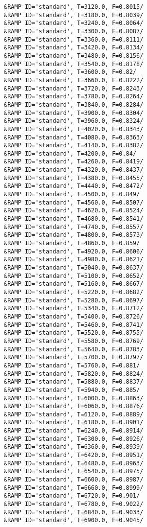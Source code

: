 \begin{lstlisting}
&RAMP ID='standard', T=3120.0, F=0.8015/
&RAMP ID='standard', T=3180.0, F=0.8039/
&RAMP ID='standard', T=3240.0, F=0.8064/
&RAMP ID='standard', T=3300.0, F=0.8087/
&RAMP ID='standard', T=3360.0, F=0.8111/
&RAMP ID='standard', T=3420.0, F=0.8134/
&RAMP ID='standard', T=3480.0, F=0.8156/
&RAMP ID='standard', T=3540.0, F=0.8178/
&RAMP ID='standard', T=3600.0, F=0.82/
&RAMP ID='standard', T=3660.0, F=0.8222/
&RAMP ID='standard', T=3720.0, F=0.8243/
&RAMP ID='standard', T=3780.0, F=0.8264/
&RAMP ID='standard', T=3840.0, F=0.8284/
&RAMP ID='standard', T=3900.0, F=0.8304/
&RAMP ID='standard', T=3960.0, F=0.8324/
&RAMP ID='standard', T=4020.0, F=0.8343/
&RAMP ID='standard', T=4080.0, F=0.8363/
&RAMP ID='standard', T=4140.0, F=0.8382/
&RAMP ID='standard', T=4200.0, F=0.84/
&RAMP ID='standard', T=4260.0, F=0.8419/
&RAMP ID='standard', T=4320.0, F=0.8437/
&RAMP ID='standard', T=4380.0, F=0.8455/
&RAMP ID='standard', T=4440.0, F=0.8472/
&RAMP ID='standard', T=4500.0, F=0.849/
&RAMP ID='standard', T=4560.0, F=0.8507/
&RAMP ID='standard', T=4620.0, F=0.8524/
&RAMP ID='standard', T=4680.0, F=0.8541/
&RAMP ID='standard', T=4740.0, F=0.8557/
&RAMP ID='standard', T=4800.0, F=0.8573/
&RAMP ID='standard', T=4860.0, F=0.859/
&RAMP ID='standard', T=4920.0, F=0.8606/
&RAMP ID='standard', T=4980.0, F=0.8621/
&RAMP ID='standard', T=5040.0, F=0.8637/
&RAMP ID='standard', T=5100.0, F=0.8652/
&RAMP ID='standard', T=5160.0, F=0.8667/
&RAMP ID='standard', T=5220.0, F=0.8682/
&RAMP ID='standard', T=5280.0, F=0.8697/
&RAMP ID='standard', T=5340.0, F=0.8712/
&RAMP ID='standard', T=5400.0, F=0.8726/
&RAMP ID='standard', T=5460.0, F=0.8741/
&RAMP ID='standard', T=5520.0, F=0.8755/
&RAMP ID='standard', T=5580.0, F=0.8769/
&RAMP ID='standard', T=5640.0, F=0.8783/
&RAMP ID='standard', T=5700.0, F=0.8797/
&RAMP ID='standard', T=5760.0, F=0.881/
&RAMP ID='standard', T=5820.0, F=0.8824/
&RAMP ID='standard', T=5880.0, F=0.8837/
&RAMP ID='standard', T=5940.0, F=0.885/
&RAMP ID='standard', T=6000.0, F=0.8863/
&RAMP ID='standard', T=6060.0, F=0.8876/
&RAMP ID='standard', T=6120.0, F=0.8889/
&RAMP ID='standard', T=6180.0, F=0.8901/
&RAMP ID='standard', T=6240.0, F=0.8914/
&RAMP ID='standard', T=6300.0, F=0.8926/
&RAMP ID='standard', T=6360.0, F=0.8939/
&RAMP ID='standard', T=6420.0, F=0.8951/
&RAMP ID='standard', T=6480.0, F=0.8963/
&RAMP ID='standard', T=6540.0, F=0.8975/
&RAMP ID='standard', T=6600.0, F=0.8987/
&RAMP ID='standard', T=6660.0, F=0.8999/
&RAMP ID='standard', T=6720.0, F=0.901/
&RAMP ID='standard', T=6780.0, F=0.9022/
&RAMP ID='standard', T=6840.0, F=0.9033/
&RAMP ID='standard', T=6900.0, F=0.9045/

\end{lstlisting}
